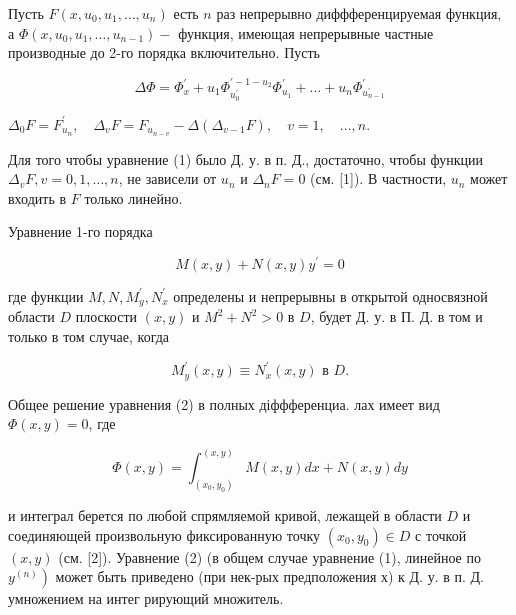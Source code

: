 \documentclass[10pt]{article}
\begin{document}
Пусть $F\left(x, u_{0}, u_{1}, \ldots, u_{n}\right)$ есть $n$ раз непрерывно диффференцируемая функция, а $\Phi\left(x, u_{0}, u_{1}, \ldots, u_{n-1}\right)-$ функция, имеющая непрерывные частные производные до 2-го порядка включительно. Пусть



\[

\Delta \Phi=\Phi_{x}^{\prime}+u_{1} \Phi_{u_{0}^{\prime}}^{\prime-1-u_{2}} \Phi_{u_{1}}^{\prime}+\ldots+u_{n} \Phi_{u_{n-1}^{\prime}}^{\prime}

\]



$\Delta_{0} F=F_{u_{n}}^{\prime}, \quad \Delta_{v} F=F_{u_{n-v}}-\Delta\left(\Delta_{v-1} F\right), \quad v=1, \quad \ldots, n$.



Для того чтобы уравнение (1) было Д. у. в п. Д., достаточно, чтобы функции $\Delta_{v} F, v=0,1, \ldots, n$, не зависели от $u_{n}$ и $\Delta_{n} F=0$ (см. [1]). В частности, $u_{n}$ может входить в $F$ только линейно.



Уравнение 1-го порядка



\[

M(x, y)+N(x, y) y^{\prime}=0

\]



где функции $M, N, M_{y}^{\prime}, N_{x}^{\prime}$ определены и непрерывны в открытой односвязной области $D$ плоскости $(x, y)$ и $M^{2}+N^{2}>0$ в $D$, будет Д. у. в П. Д. в том и только в том случае, когда



\[

M_{y}^{\prime}(x, y) \equiv N_{x}^{\prime}(x, y) \text { в } D .

\]



Общее решение уравнения (2) в полных діффференциа. лах имеет вид $\Phi(x, y)=0$, где



\[

\Phi(x, y)=\int_{\left(x_{0}, y_{0}\right)}^{(x, y)} M(x, y) d x+N(x, y) d y

\]



и интеграл берется по любой спрямляемой кривой, лежащей в области $D$ и соединяющей произвольную фиксированную точку $\left(x_{0}, y_{0}\right) \in D$ с точкой $(x, y)$ (см. [2]). Уравнение (2) (в общем случае уравнение (1), линейное по $\left.y^{(n)}\right)$ может быть приведено (при нек-рых предположения х) к Д. у. в п. Д. умножением на интег рирующий множитель.
\end{document}
